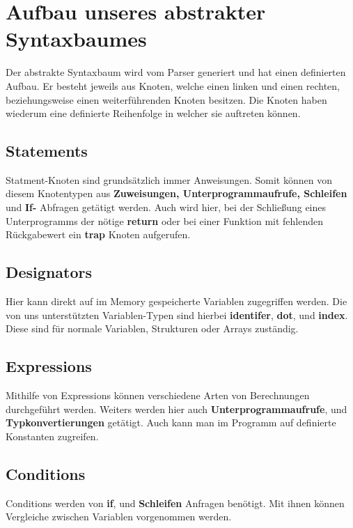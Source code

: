 \section{Aufbau unseres abstrakter Syntaxbaumes}
Der abstrakte Syntaxbaum wird vom Parser generiert und hat einen definierten Aufbau. Er besteht jeweils aus Knoten, welche einen linken und einen rechten, beziehungsweise einen weiterführenden Knoten besitzen. Die Knoten haben wiederum eine definierte Reihenfolge in welcher sie auftreten können. 

\subsection{Statements}
Statment-Knoten sind grundsätzlich immer Anweisungen. Somit können von diesem Knotentypen aus \textbf{Zuweisungen, Unterprogrammaufrufe, Schleifen} und \textbf{If-} Abfragen getätigt werden. Auch wird hier, bei der Schließung eines Unterprogramms der nötige \textbf{return} oder bei einer Funktion mit fehlenden Rückgabewert ein \textbf{trap} Knoten aufgerufen. 



\subsection{Designators}
Hier kann direkt auf im Memory gespeicherte Variablen zugegriffen werden. Die von uns unterstützten Variablen-Typen sind hierbei \textbf{identifer}, \textbf{dot}, und \textbf{index}. Diese sind für normale Variablen, Strukturen oder Arrays zuständig.

\subsection{Expressions}
\label{sec:expressions}
Mithilfe von Expressions können verschiedene Arten von Berechnungen durchgeführt werden. Weiters werden hier auch \textbf{Unterprogrammaufrufe}, und \textbf{Typkonvertierungen} getätigt. Auch kann man im Programm auf definierte Konstanten zugreifen.

\subsection{Conditions}
Conditions werden von \textbf{if}, und \textbf{Schleifen} Anfragen benötigt. Mit ihnen können Vergleiche zwischen Variablen vorgenommen werden.

